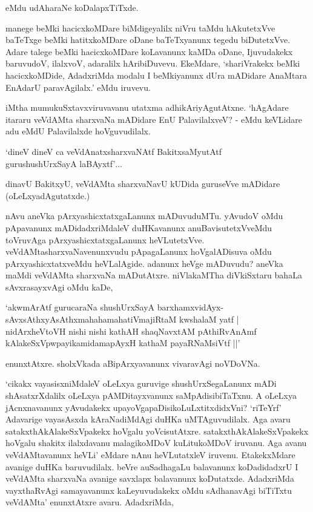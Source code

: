 eMdu udAharaNe koDalapxTiTxde.

manege beMki hacicxkoMDare biMdigeyalilx niVru taMdu hAkutetxVve baTeTxge beMki hatitxkoMDare oDane baTeTxyanunx tegedu biDutetxVve. Adare talege beMki hacicxkoMDare koLavanunx kaMDa oDane, Ijuvudakekx baruvudoV, ilalxvoV, adaralilx hAribiDuvevu. EkeMdare, `shariVrakekx beMki hacicxkoMDide, AdadxriMda modalu I beMkiyanunx dUra mADidare AnaMtara EnAdarU paravAgilalx.' eMdu iruvevu.

iMtha mumukuSxtavxviruvavanu utatxma adhikAriyAgutAtxne. `hAgAdare itararu veVdAMta sharxvaNa mADidare EnU PalavilalxveV? - eMdu keVLidare adu eMdU Palavilalxde hoVguvudilalx.

\begin{shloka}
`dineV dineV ca veVdAnatxsharxvaNAtf BakitxsaMyutAtf\\
gurushushUrxSayA laBAyxtf'$\ldots$ 
\end{shloka}

dinavU BakitxyU, veVdAMta sharxvaNavU kUDida guruseVve mADidare (oLeLxyadAgutatxde.)

nAvu aneVka pArxyashicxtatxgaLanunx mADuvuduMTu. yAvudoV oMdu pApavanunx mADidadxriMdaleV duHKavanunx anuBavisutetxVveMdu toVruvAga pArxyashicxtatxgaLanunx heVLutetxVve. veVdAMtasharxvaNavenunxvudu pApagaLanunx hoVgalADisuva oMdu pArxyashicxtatxveMdu heVLalAgide. adanunx heVge mADuvudu? aneVka maMdi veVdAMta sharxvaNa mADutAtxre. niVlakaMTha diVkiSxtaru bahaLa sAvxrasayxvAgi oMdu kaDe,

\begin{shloka}
`akwmArAtf gurucaraNa shushUrxSayA barxhamxvidAyx-\\
sAvxsAthxyAsAthxmahahamahatiVmajiRtaM kwshalaM yatf |\\
nidArxheVtoVH nishi nishi kathAH shaqNavxtAM pAthiRvAnAmf\\
kAlakeSxVpwpayikamidamapAyxH kathaM payaRNaMsiVtf ||'
\end{shloka}

enunxtAtxre. sholxVkada aBipArxyavanunx vivaravAgi noVDoVNa.

`cikakx vayasisxniMdaleV oLeLxya guruvige shushUrxSegaLanunx mADi shAsatxrXdalilx oLeLxya pAMDitayxvanunx saMpAdisibiTaTxnu. A oLeLxya jAcnxnavanunx yAvudakekx upayoVgapaDisikoLuLxtitxdidxVni? `riTeYrf' Adavarige vayasAsxda kAraNadiMdAgi duHKa uMTAguvudilalx. Aga avaru satakxthAkAlakeSxVpakekx hoVgalu yoVcisutAtxre. satakxthAkAlakeSxVpakekx hoVgalu shakitx ilalxdavanu malagikoMDoV kuLitukoMDoV iruvanu. Aga avanu veVdAMtavanunx heVLi' eMdare nAnu heVLutatxleV iruvenu. EtakekxMdare avanige duHKa baruvudilalx. beVre auSadhagaLu balavanunx koDadidadxrU I veVdAMta sharxvaNa avanige savxlapx balavanunx koDutatxde. AdadxriMda vayxthaRvAgi samayavanunx kaLeyuvudakekx oMdu sAdhanavAgi biTiTxtu veVdAMta' enunxtAtxre avaru. AdadxriMda,

